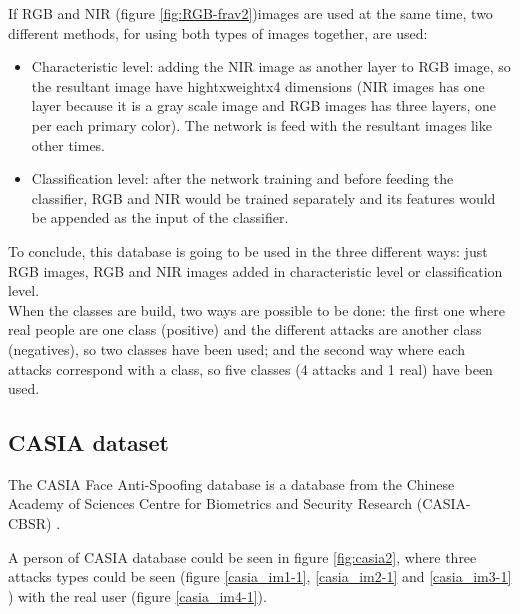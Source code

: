 If RGB and NIR (figure \ref{fig:RGB-frav2})images are used at the same time, two different methods, for using both types of images together, are used:
\begin{itemize}
\item Characteristic level: adding the NIR image as another layer to RGB image, so the resultant image have hightxweightx4 dimensions (NIR images has one layer because it is a gray scale image and RGB images has three layers, one per each primary color). The network is feed with the resultant images like other times.
\item Classification level: after the network training and before feeding the classifier, RGB and NIR would be trained separately and its features would be appended as the input of the classifier.
\end{itemize}

To conclude, this database is going to be used in the three different ways: just RGB images, RGB and NIR images added in characteristic level or classification level.\\

When the classes are build, two ways are possible to be done: the first one where real people are one class (positive) and the different attacks are another class (negatives), so two classes have been used; and the second way where each attacks correspond with a class, so five classes (4 attacks and 1 real) have been used.\\


\subsection{CASIA dataset}
The CASIA Face Anti-Spoofing database is a database from the Chinese Academy of Sciences Centre for Biometrics and Security Research (CASIA-CBSR) \cite{Casiadatbase}.

A person of CASIA database could be seen in figure \ref{fig:casia2}, where three attacks types could be seen (figure \ref{casia_im1-1}, \ref{casia_im2-1} and \ref{casia_im3-1} ) with the real user (figure \ref{casia_im4-1}). \\

